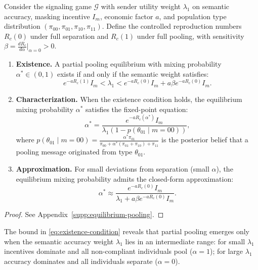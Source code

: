 \documentclass[sigconf,review]{acmart}
\begin{document}
\begin{theorem}
\label{thm:partial-pooling}
Consider the signaling game $\mathcal{G}$ with sender utility weight $\lambda_1$ on semantic accuracy, masking incentive $I_m$, economic factor $a$, and population type distribution $(\pi_{00}, \pi_{01}, \pi_{10}, \pi_{11})$. Define the controlled reproduction numbers $R_c(0)$ under full separation and $R_c(1)$ under full pooling, with sensitivity $\beta = \frac{dR_c}{d\alpha}\big|_{\alpha=0} > 0$.

\begin{enumerate}
    \item \textbf{Existence.} A partial pooling equilibrium with mixing probability $\alpha^* \in (0,1)$ exists if and only if the semantic weight satisfies:
    \begin{equation}
        e^{-aR_c(1)} I_m < \lambda_1 < e^{-aR_c(0)} I_m + a\beta e^{-aR_c(0)} I_m.
        \label{eq:existence-condition}
    \end{equation}
    
    \item \textbf{Characterization.} When the existence condition holds, the equilibrium mixing probability $\alpha^*$ satisfies the fixed-point equation:
    \begin{equation}
        \alpha^* = \frac{e^{-aR_c(\alpha^*)} I_m}{\lambda_1 \left(1 - p(\theta_{01} \mid m = 00)\right)},
        \label{eq:fixed-point}
    \end{equation}
    where $p(\theta_{01} \mid m = 00) = \frac{\alpha^* \pi_{01}}{\pi_{00} + \alpha^*(\pi_{01} + \pi_{10}) + \pi_{11}}$ is the posterior belief that a pooling message originated from type $\theta_{01}$.
    
    \item \textbf{Approximation.} For small deviations from separation (small $\alpha$), the equilibrium mixing probability admits the closed-form approximation:
    \begin{equation}
        \alpha^* \approx \frac{e^{-aR_c(0)} I_m}{\lambda_1 + a\beta e^{-aR_c(0)} I_m}.
        \label{eq:alpha-approx}
    \end{equation}
\end{enumerate}
\end{theorem}

\begin{proof}
See Appendix~\ref{supp:equilibrium-pooling}.
\end{proof}
The bound in  \eqref{eq:existence-condition} reveals that partial pooling emerges only when the semantic accuracy weight $\lambda_1$ lies in an intermediate range: for small $\lambda_1$ incentives dominate and all non-compliant individuals pool ($\alpha=1$); for large $\lambda_1$ accuracy dominates and all individuals separate ($\alpha=0$). %
\end{document}
